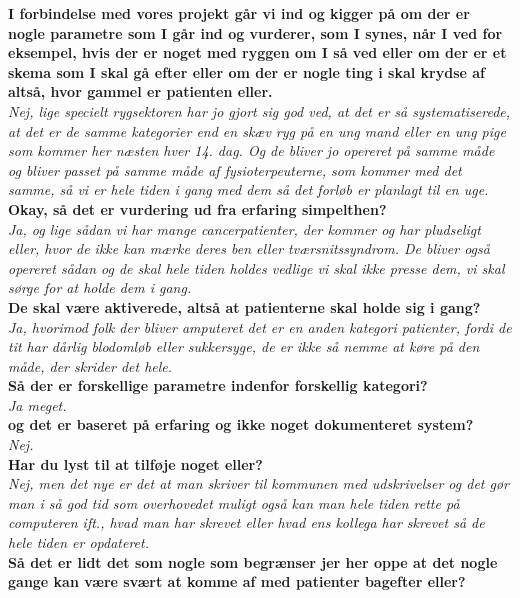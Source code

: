 \noindent
\textbf{I forbindelse med vores projekt går vi ind og kigger på om der er nogle parametre som I går ind og vurderer, som I synes, når I ved for eksempel, hvis der er noget med ryggen om I så ved eller om der er et skema som I skal gå efter eller om der er nogle ting i skal krydse af altså, hvor gammel er patienten eller.}\\
\noindent
\textit{Nej, lige specielt rygsektoren har jo gjort sig god ved, at det er så systematiserede, at det er de samme kategorier end en skæv ryg på en ung mand eller en ung pige som kommer her næsten hver 14. dag. Og de bliver jo opereret på samme måde og bliver passet på samme måde af fysioterpeuterne, som kommer med det samme, så vi er hele tiden i gang med dem så det forløb er planlagt til en uge.}\\
\noindent
\textbf{Okay, så det er vurdering ud fra erfaring simpelthen?}\\
\noindent
\textit{Ja, og lige sådan vi har mange cancerpatienter, der kommer og har pludseligt eller, hvor de ikke kan mærke deres ben eller tværsnitssyndrom. De bliver også opereret sådan og de skal hele tiden holdes vedlige vi skal ikke presse dem, vi skal sørge for at holde dem i gang.}\\
\noindent
\textbf{De skal være aktiverede, altså at patienterne skal holde sig i gang?}\\
\noindent
\textit{Ja, hvorimod folk der bliver amputeret det er en anden kategori patienter, fordi de tit har dårlig blodomløb eller sukkersyge, de er ikke så nemme at køre på den måde, der skrider det hele.}\\
\noindent
\textbf{Så der er forskellige parametre indenfor forskellig kategori?}\\
\noindent
\textit{Ja meget.}\\
\noindent
\textbf{og det er baseret på erfaring og ikke noget dokumenteret system?}\\
\noindent
\textit{ Nej.}\\
\noindent
\textbf{Har du lyst til at tilføje noget eller?}\\
\noindent
\textit{Nej, men det nye er det at man skriver til kommunen med udskrivelser og det gør man i så god tid som overhovedet muligt også kan man hele tiden rette på computeren ift., hvad man har skrevet eller hvad ens kollega har skrevet så de hele tiden er opdateret.}\\
\textbf{Så det er lidt det som nogle som begrænser jer her oppe at det nogle gange kan være svært at komme af med patienter bagefter eller?}\\
